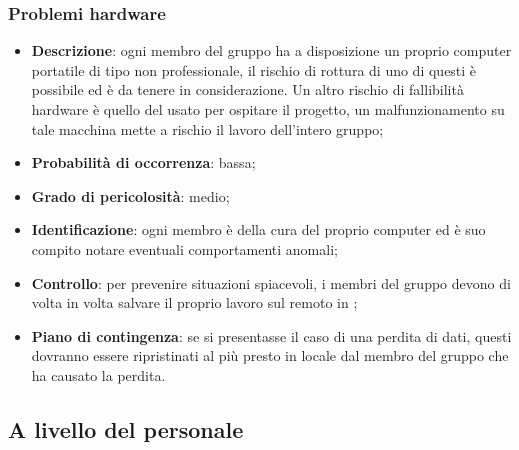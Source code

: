 \subsubsection{Problemi hardware}
\begin{itemize}
			\item \textbf{Descrizione}: ogni membro del gruppo ha a disposizione un proprio computer portatile di tipo non professionale, il rischio di rottura di uno di questi è possibile ed è da tenere in considerazione. Un altro rischio di fallibilità hardware è quello del  usato per ospitare il progetto, un malfunzionamento su tale macchina mette a rischio il lavoro dell'intero gruppo;
			\item \textbf{Probabilità di occorrenza}: bassa;
			\item \textbf{Grado di pericolosità}: medio;
			\item \textbf{Identificazione}: ogni membro è  della cura del proprio computer ed è suo compito notare eventuali comportamenti anomali;
			\item \textbf{Controllo}: per prevenire situazioni spiacevoli, i membri del gruppo devono di volta in volta salvare il proprio lavoro sul  remoto in ;
			\item \textbf{Piano di contingenza}: se si presentasse il caso di una perdita di dati, questi dovranno essere ripristinati al più presto in locale dal membro del gruppo che ha causato la perdita.
\end{itemize}



\subsection{A livello del personale}
